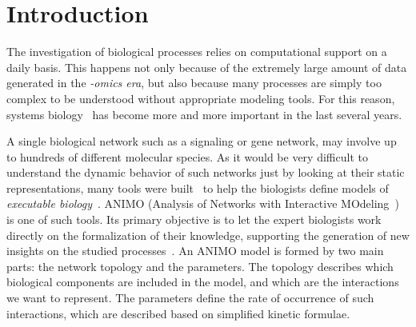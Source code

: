 \documentclass[submission,copyright,creativecommons]{eptcs}
\begin{document}
\section{Introduction}
The investigation of biological processes relies on computational support on a daily basis.
This happens not only because of the extremely large amount of data generated in the \emph{-omics era},
but also because many processes are simply too complex to be understood without appropriate modeling tools.
For this reason, systems biology~\cite{priami-alg-sys-bio} has become more and more important in the last several years.

A single biological network such as a signaling or gene network, may involve up to hundreds of
different molecular species. As it would be very difficult to understand the dynamic behavior of such
networks just by looking at their static representations, many tools were built~\cite{biopepa-interface,
blenx, cell-illustrator, copasi, ginsim, gna} to help the biologists define models of \emph{executable biology}~\cite{ex-bio}.
ANIMO (Analysis of Networks with Interactive MOdeling~\cite{animo-ieee}) is one of such tools. Its primary objective is to let the expert biologists
work directly on the formalization of their knowledge, supporting the generation of new insights on the studied processes~\cite{animo-gene}.
An ANIMO model is formed by two main parts: the network topology and the parameters.
The topology describes which biological components are included in the model, and which are the
interactions we want to represent. The parameters define the rate of occurrence of such interactions,
which are described based on simplified kinetic formulae.
\end{document}
